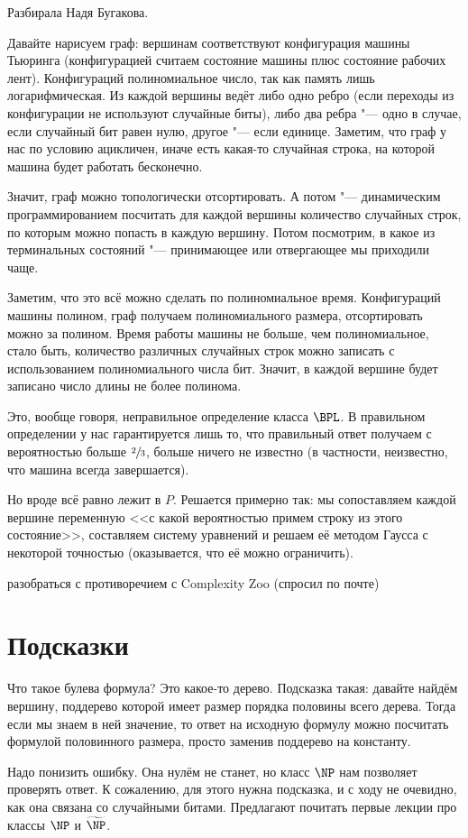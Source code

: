 	Разбирала Надя Бугакова.

	Давайте нарисуем граф: вершинам соответствуют конфигурация машины Тьюринга (конфигурацией
	считаем состояние машины плюс состояние рабочих лент).
	Конфигураций полиномиальное число, так как память лишь логарифмическая.
	Из каждой вершины ведёт либо одно ребро (если переходы из конфигурации не используют случайные биты),
	либо два ребра "--- одно в случае, если случайный бит равен нулю, другое "--- если единице.
	Заметим, что граф у нас по условию ацикличен, иначе есть какая-то случайная строка, на которой машина будет работать бесконечно.

	Значит, граф можно топологически отсортировать.
	А потом "--- динамическим программированием посчитать для каждой вершины количество случайных строк,
	по которым можно попасть в каждую вершину.
	Потом посмотрим, в какое из терминальных состояний "--- принимающее или отвергающее мы приходили чаще.

	Заметим, что это всё можно сделать по полиномиальное время.
	Конфигураций машины полином, граф получаем полиномиального размера, отсортировать можно за полином.
	Время работы машины не больше, чем полиномиальное, стало быть, количество
	различных случайных строк можно записать с использованием полиномиального числа бит.
	Значит, в каждой вершине будет записано число длины не более полинома.

	\begin{Rem}
		Это, вообще говоря, неправильное определение класса $\BPL$.
		В правильном определении у нас гарантируется лишь 
		то, что правильный ответ получаем с вероятностью больше $\sfrac 23$, больше ничего не известно
		(в частности, неизвестно, что машина всегда завершается).

		Но вроде всё равно лежит в $P$.
		Решается примерно так: мы сопоставляем каждой вершине переменную <<с какой вероятностью
		примем строку из этого состояние>>, составляем систему уравнений и решаем
		её методом Гаусса с некоторой точностью (оказывается, что её можно ограничить).

		\TODO разобраться с противоречием с Complexity Zoo (спросил по почте)
	\end{Rem}

\section{Подсказки}
	Что такое булева формула?
	Это какое-то дерево.
	Подсказка такая: давайте найдём вершину, поддерево которой имеет размер порядка половины всего дерева.
	Тогда если мы знаем в ней значение, то ответ на исходную формулу можно посчитать формулой половинного размера,
	просто заменив поддерево на константу.

	Надо понизить ошибку.
	Она нулём не станет, но класс $\NP$ нам позволяет проверять ответ.
	К сожалению, для этого нужна подсказка, и с ходу не очевидно, как она связана
	со случайными битами.
	Предлагают почитать первые лекции про классы $\NP$ и $\widetilde{\NP}$.
